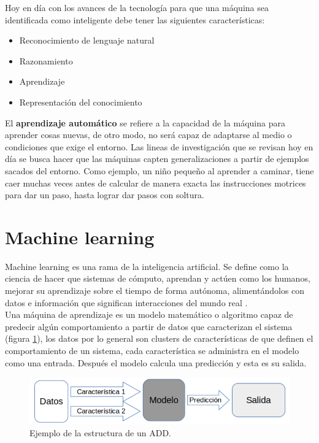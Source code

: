 \documentclass[twoside,spanish,ESP,MSc]{plantillaLabUPV}
\theoremstyle{definition}
\begin{document}
Hoy en día con los avances de la tecnología para que una máquina sea identificada como inteligente debe tener las siguientes características:

\begin{itemize}
 \itemsep 0em
 \item Reconocimiento de lenguaje natural
 \item Razonamiento
 \item Aprendizaje
 \item Representación del conocimiento
\end{itemize}

El \textbf{aprendizaje automático} se refiere a la capacidad de la máquina para aprender cosas nuevas, de otro modo, no será capaz de adaptarse al medio o condiciones que exige el entorno. Las lineas de investigación que se revisan hoy en día se busca hacer que las máquinas capten generalizaciones a partir de ejemplos sacados del entorno. Como ejemplo, un niño pequeño al aprender a caminar, tiene caer muchas veces antes de calcular de manera exacta las instrucciones motrices para dar un paso, hasta lograr dar pasos con soltura.\\


\section{Machine learning}

Machine learning es una rama de la inteligencia artificial. Se define como la ciencia de hacer que sistemas de cómputo, aprendan y actúen como los humanos, mejorar su aprendizaje sobre el tiempo de forma autónoma, alimentándolos con datos e información que significan interacciones del mundo real \cite{mlbook}.\\

Una máquina de aprendizaje es un modelo matemático o algoritmo capaz de predecir algún comportamiento a partir de datos que caracterizan el sistema (figura \ref{fml}), los datos por lo general son clusters de características de que definen el comportamiento de un sistema, cada característica se administra en el modelo como una entrada. Después el modelo calcula una predicción y esta es su salida.

\begin{figure}[h] 
	\centering 
		\includegraphics[scale=.50]{ima_mc/flujoml} 
	\caption{Ejemplo de la estructura de un ADD.} 
	\label{fml} 
\end{figure}
\end{document}
